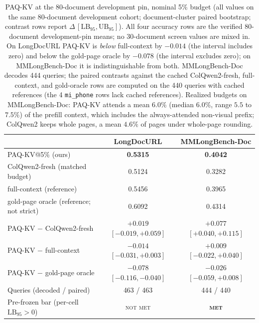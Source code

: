 \documentclass[letterpaper]{article} %
\newcommand{\paqc}{\textsc{PAQ-KV}}
\newcommand{\lb}{\mathrm{LB}_{95}}
\begin{document}
\begin{table}[t]
\centering\small
\begin{tabular}{lcc}
\toprule
 & LongDocURL & MMLongBench-Doc \\
\midrule
\paqc{}@5\% (ours) & \textbf{0.5315} & \textbf{0.4042} \\
ColQwen2-fresh (matched budget) & 0.5124 & 0.3282 \\
full-context (reference) & 0.5456 & 0.3965 \\
gold-page oracle (reference; not strict) & 0.6092 & 0.4314 \\
\midrule
\paqc{} $-$ ColQwen2-fresh & $+0.019$ $[-0.019,+0.059]$ & $+0.077$ $[+0.040,+0.115]$ \\
\paqc{} $-$ full-context & $-0.014$ $[-0.031,+0.003]$ & $+0.009$ $[-0.022,+0.040]$ \\
\paqc{} $-$ gold-page oracle & $-0.078$ $[-0.116,-0.040]$ & $-0.026$ $[-0.059,+0.008]$ \\
\midrule
Queries (decoded / paired) & 463 / 463 & 444 / 440 \\
Pre-frozen bar (per-cell $\lb>0$) & \textsc{not met} & \textbf{\textsc{met}} \\
\bottomrule
\end{tabular}
\caption{\paqc{} at the 80-document development pin, nominal 5\% budget (all values on the same 80-document development cohort; document-cluster paired bootstrap; contrast rows report $\Delta\,[\lb,\mathrm{UB}_{95}]$). All four accuracy rows are the verified 80-document development-pin means; no 30-document screen values are mixed in. On LongDocURL \paqc{} is \emph{below} full-context by $-0.014$ (the interval includes zero) and below the gold-page oracle by $-0.078$ (the interval excludes zero); on MMLongBench-Doc it is indistinguishable from both. MMLongBench-Doc decodes 444 queries; the paired contrasts against the cached ColQwen2-fresh, full-context, and gold-oracle rows are computed on the 440 queries with cached references (the 4 \texttt{mi\_phone} rows lack cached references). Realized budgets on MMLongBench-Doc: \paqc{} attends a mean $6.0\%$ (median $6.0\%$, range $5.5$ to $7.5\%$) of the prefill context, which includes the always-attended non-visual prefix; ColQwen2 keeps whole pages, a mean $4.6\%$ of pages under whole-page rounding.}
\label{tab:paqkv}
\end{table}
\end{document}
